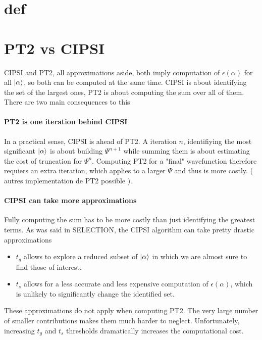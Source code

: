 \documentclass[./thesis.tex]{subfiles}
\begin{document}
\section{def}

\section{PT2 vs CIPSI}

CIPSI and PT2, all approximations aside, both imply computation of $\epsilon(\alpha)$ for all $\ket \alpha$, so both can be computed at the same time. CIPSI is about identifying the set of the largest ones, PT2 is about computing the sum over all of them. There are two main consequences to this
\paragraph{PT2 is one iteration behind CIPSI}
In a practical sense, CIPSI is ahead of PT2. A iteration $n$, identifiying the most significant $\ket \alpha$ is about building $\Psi^{n+1}$ while summing them is about estimating the cost of truncation for $\Psi^{n}$. Computing PT2 for a "final" wavefunction therefore requiers an extra iteration, which applies to a larger $\Psi$ and thus is more costly. ( autres implementation de PT2 possible ).

\paragraph{CIPSI can take more approximations}
Fully computing the sum has to be more costly than just identifying the greatest terms. As was said in SELECTION, the CIPSI algorithm can take pretty drastic approximations%
	\begin{itemize}
		\item{$t_g$}
		allows to explore a reduced subset of $\ket \alpha$ in which we are almost sure to find those of interest.
		\item{$t_s$}
		allows for a less accurate and less expensive computation of $\epsilon(\alpha)$, which is unlikely to significantly change the identified set.
	\end{itemize}
	These approximations do not apply when computing PT2. The very large number of smaller contributions makes them much harder to neglect. Unfortunately, increasing $t_g$ and $t_s$ thresholds dramatically increases the computational cost.
\end{document}
